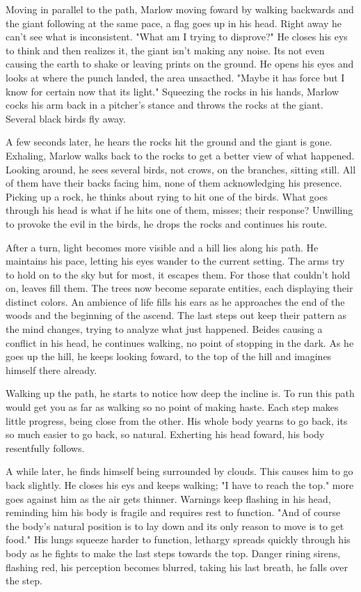 		Moving in parallel to the path, Marlow moving foward by walking backwards and the giant following at the same pace, a flag goes up in his head. Right
	away he can't see what is inconsistent. "What am I trying to disprove?" He closes his eys to think and then realizes it, the giant isn't making any noise.
	Its not even causing the earth to shake or leaving prints on the ground. He opens his eyes and looks at where the punch landed, the area unsacthed. "Maybe
	it has force but I know for certain now that its light." Squeezing the rocks in his hands, Marlow cocks his arm back in a pitcher's stance and throws the
	rocks at the giant. Several black birds fly away.

		A few seconds later, he hears the rocks hit the ground and the giant is gone. Exhaling, Marlow walks back to the rocks to get a better view of what
	happened. Looking around, he sees several birds, not crows, on the branches, sitting still. All of them have their backs facing him, none of them acknowledging
	his presence. Picking up a rock, he thinks about rying to hit one of the birds. What goes through his head is what if he hits one of them, misses; their
	response? Unwilling to provoke the evil in the birds, he drops the rocks and continues his route.

		After a turn, light becomes more visible and a hill lies along his path. He maintains his pace, letting his eyes wander to the current setting. The 
	arms try to hold on to the sky but for most, it escapes them. For those that couldn't hold on, leaves fill them. The trees now become separate entities, each
	displaying their distinct colors. An ambience of life fills his ears as he approaches the end of the woods and the beginning of the ascend. The last steps out
	keep their pattern as the mind changes, trying to analyze what just happened. Beides causing a conflict in his head, he continues walking, no point of 
	stopping in the dark. As he goes up the hill, he keeps looking foward, to the top of the hill and imagines himself there already.

		Walking up the path, he starts to notice how deep the incline is. To run this path would get you as far as walking so no point of making haste. Each
	step makes little progress, being close from the other. His whole body yearns to go back, its so much easier to go back, so natural. Exherting his head foward,
	his body resentfully follows.

		A while later, he finds himself being surrounded by clouds. This causes him to go back slightly. He closes his eys and keeps walking; "I have to reach
	the top." more goes against him as the air gets thinner. Warnings keep flashing in his head, reminding him his body is fragile and requires rest to function.
	"And of course the body's natural position is to lay down and its only reason to move is to get food." His lungs squeeze harder to function, lethargy spreads
	quickly through his body as he fights to make the last steps towards the top. Danger rining sirens, flashing red, his perception becomes blurred, taking his
	last breath, he falls over the step.

